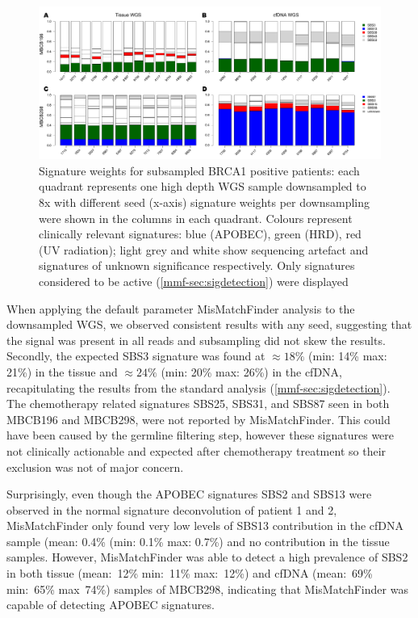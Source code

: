 \begin{figure}[hb]
\centering
\includegraphics[width=.99\linewidth]{Figures/MisMatchFinder/brca1BarPlots.pdf}
\caption[Signature weights for subsampled BRCA1 positive patients]{Signature weights for subsampled BRCA1 positive patients: each quadrant represents one high depth WGS sample downsampled to 8x with different seed (x-axis) signature weights per downsampling were shown in the columns in each quadrant. Colours represent clinically relevant signatures: blue (APOBEC), green (HRD), red (UV radiation); light grey and white show sequencing artefact and signatures of unknown significance respectively. Only signatures considered to be active (\autoref{mmf-sec:sigdetection}) were displayed}\label{fig:mmf-mbcbBarPlot}
\end{figure}

When applying the default parameter MisMatchFinder analysis to the downsampled WGS, we observed consistent results with any seed, suggesting that the signal was present in all reads and subsampling did not skew the results. Secondly, the expected SBS3 signature was found at $\approx 18\%$ (min: 14\% max: 21\%) in the tissue and $\approx 24\%$ (min: 20\% max: 26\%) in the cfDNA, recapitulating the results from the standard analysis (\autoref{mmf-sec:sigdetection}). The chemotherapy related signatures SBS25, SBS31, and SBS87 seen in both MBCB196 and MBCB298, were not reported by MisMatchFinder. This could have been caused by the germline filtering step, however these signatures were not clinically actionable and expected after chemotherapy treatment so their exclusion was not of major concern.

Surprisingly, even though the APOBEC signatures SBS2 and SBS13 were observed in the normal signature deconvolution of patient 1 and 2, MisMatchFinder only found very low levels of SBS13 contribution in the cfDNA sample (mean: 0.4\% (min: 0.1\% max: 0.7\%) and no contribution in the tissue samples. However, MisMatchFinder was able to detect a high prevalence of SBS2 in both tissue (mean:~12\% min:~11\% max:~12\%) and cfDNA (mean:~69\% min:~65\% max~74\%) samples of MBCB298, indicating that MisMatchFinder was capable of detecting APOBEC signatures. 

